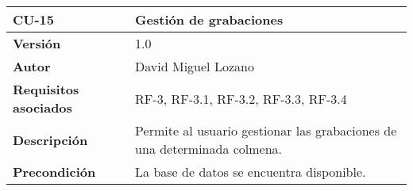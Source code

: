 \begin{longtable}[H]{@{}ll@{}}
\toprule
\begin{minipage}[b]{0.20\columnwidth}\raggedright\strut
\textbf{CU-15}\strut
\end{minipage} & \begin{minipage}[b]{0.74\columnwidth}\raggedright\strut
\textbf{Gestión de grabaciones}\strut
\end{minipage}\tabularnewline
\midrule
\endhead
\begin{minipage}[t]{0.20\columnwidth}\raggedright\strut
\textbf{Versión}\strut
\end{minipage} & \begin{minipage}[t]{0.74\columnwidth}\raggedright\strut
1.0\strut
\end{minipage}\tabularnewline
\begin{minipage}[t]{0.20\columnwidth}\raggedright\strut
\textbf{Autor}\strut
\end{minipage} & \begin{minipage}[t]{0.74\columnwidth}\raggedright\strut
David Miguel Lozano\strut
\end{minipage}\tabularnewline
\begin{minipage}[t]{0.20\columnwidth}\raggedright\strut
\textbf{Requisitos asociados}\strut
\end{minipage} & \begin{minipage}[t]{0.74\columnwidth}\raggedright\strut
RF-3, RF-3.1, RF-3.2, RF-3.3, RF-3.4\strut
\end{minipage}\tabularnewline
\begin{minipage}[t]{0.20\columnwidth}\raggedright\strut
\textbf{Descripción}\strut
\end{minipage} & \begin{minipage}[t]{0.74\columnwidth}\raggedright\strut
Permite al usuario gestionar las grabaciones de una determinada
colmena.\strut
\end{minipage}\tabularnewline
\begin{minipage}[t]{0.20\columnwidth}\raggedright\strut
\textbf{Precondición}\strut
\end{minipage} & \begin{minipage}[t]{0.74\columnwidth}\raggedright\strut
La base de datos se encuentra disponible.


\end{minipage}
\end{longtable}

